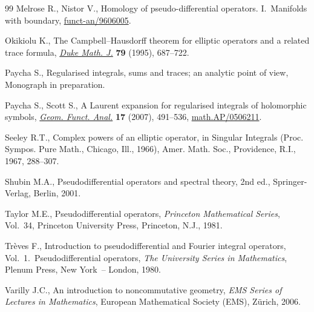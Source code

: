 \documentclass[11pt]{article}
\numberwithin{equation}{section}
\begin{document}
\begin{thebibliography}{99}
Melrose R.,  Nistor V.,
Homology of pseudo-dif\/ferential operators. I.~Manifolds with boundary,
\mbox{\href{http://arxiv.org/abs/funct-an/9606005}{funct-an/9606005}}. %

 Okikiolu K.,
 The Campbell--Hausdorf\/f theorem for elliptic operators and a related trace formula,
\href{http://dx.doi.org/10.1215/S0012-7094-95-07918-6}{{\it Duke Math. J.}}  {\bf 79}  (1995), 687--722.

 Paycha S.,
 Regularised integrals, sums and traces; an  analytic point of view, Monograph in preparation.

  Paycha  S., Scott  S.,
  A  Laurent expansion for  regularised integrals of holomorphic symbols,
\href{http://dx.doi.org/10.1007/s00039-007-0597-8}{{\it Geom.  Funct. Anal.}} {\bf 17} (2007), 491--536,
\href{http://arxiv.org/abs/math.AP/0506211}{math.AP/0506211}.

Seeley R.T.,
Complex powers of an elliptic operator,
in Singular Integrals (Proc. Sympos. Pure Math., Chicago, Ill., 1966), Amer. Math. Soc., Providence, R.I., 1967, 288--307.

Shubin M.A.,
Pseudodif\/ferential operators and spectral theory, 2nd ed., Springer-Verlag, Berlin, 2001.


Taylor M.E.,  Pseudodif\/ferential operators,
{\it Princeton Mathematical Series}, Vol.~34, Princeton University Press, Princeton, N.J., 1981.

Tr\`eves F.,
Introduction to pseudodif\/ferential and Fourier integral operators, Vol.~1.~Pseudodif\/ferential opera\-tors,
 {\it The University Series in Mathematics}, Plenum Press, New York~-- London, 1980.

Varilly J.C.,
An introduction to noncommutative geometry,
{\it EMS Series of Lectures in Mathematics}, European Mathematical Society (EMS), Z\"urich, 2006.

  \end{thebibliography}
\end{document}
